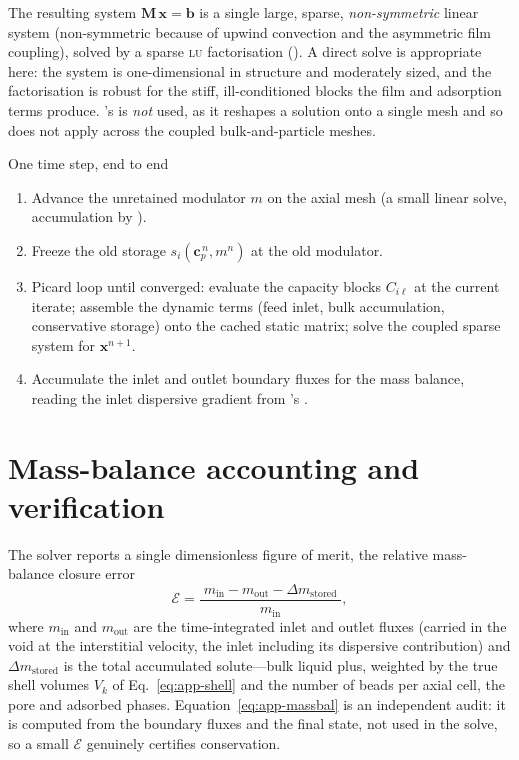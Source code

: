 The resulting system $\bm M\,\bm x = \bm b$ is a single large, sparse,
\emph{non-symmetric} linear system (non-symmetric because of upwind convection and
the asymmetric film coupling), solved by a sparse \textsc{lu} factorisation
(). A direct solve is appropriate here: the
system is one-dimensional in structure and moderately sized, and the
factorisation is robust for the stiff, ill-conditioned blocks the film and
adsorption terms produce. 's  is \emph{not}
used, as it reshapes a solution onto a single mesh and so does not apply across the
coupled bulk-and-particle meshes.

\begin{keybox}{One time step, end to end}
\begin{enumerate}\setlength\itemsep{2pt}
  \item Advance the unretained modulator $m$ on the axial mesh (a small linear
  solve, accumulation by ).
  \item Freeze the old storage $s_i(\bm c_p^{\,n}, m^{n})$ at the old modulator.
  \item Picard loop until converged: evaluate the capacity blocks $C_{i\ell}$ at
  the current iterate; assemble the dynamic terms (feed inlet, bulk accumulation,
  conservative storage) onto the cached static matrix; solve the coupled sparse
  system for $\bm x^{n+1}$.
  \item Accumulate the inlet and outlet boundary fluxes for the mass balance,
  reading the inlet dispersive gradient from 's .
\end{enumerate}
\end{keybox}

\section{Mass-balance accounting and verification}
\label{app:grm-massbalance}

The solver reports a single dimensionless figure of merit, the relative
mass-balance closure error
%
\begin{equation}
\mathcal{E}
  = \frac{\;m_{\mathrm{in}} - m_{\mathrm{out}} - \Delta m_{\mathrm{stored}}\;}
         {m_{\mathrm{in}}},
\label{eq:app-massbal}
\end{equation}
%
where $m_{\mathrm{in}}$ and $m_{\mathrm{out}}$ are the time-integrated inlet and
outlet fluxes (carried in the void at the interstitial velocity, the inlet
including its dispersive contribution) and $\Delta m_{\mathrm{stored}}$ is the
total accumulated solute---bulk liquid plus, weighted by the true shell volumes
$V_k$ of Eq.~\eqref{eq:app-shell} and the number of beads per axial cell, the
pore and adsorbed phases. Equation~\eqref{eq:app-massbal} is an independent
audit: it is computed from the boundary fluxes and the final state, not used in
the solve, so a small $\mathcal{E}$ genuinely certifies conservation.

